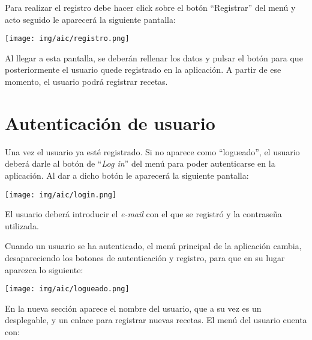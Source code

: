 \documentclass{\ClassPath/viu-tfm-template}
\begin{document}
Para realizar el registro debe hacer click sobre el botón “Registrar” del menú y acto seguido le aparecerá la siguiente pantalla:

\begin{center}
    \vspace{-10pt}
    \texttt{[image: img/aic/registro.png]}
    \vspace{-20pt}
\end{center}

Al llegar a esta pantalla, se deberán rellenar los datos y pulsar el botón para que posteriormente el usuario quede registrado en la aplicación. A partir de ese momento, el usuario podrá registrar recetas.


\section{Autenticación de usuario}
Una vez el usuario ya esté registrado. Si no aparece como “logueado”, el usuario deberá darle al botón de “\textit{Log in}” del menú para poder autenticarse en la aplicación. Al dar a dicho botón le aparecerá la siguiente pantalla:

\begin{center}
    \vspace{-10pt}
    \texttt{[image: img/aic/login.png]}
    \vspace{-20pt}
\end{center}

El usuario deberá introducir el \textit{e-mail} con el que se registró y la contraseña utilizada.

Cuando un usuario se ha autenticado, el menú principal de la aplicación cambia, desapareciendo los botones de autenticación y registro, para que en su lugar aparezca lo siguiente:


\begin{center}
    \vspace{-10pt}
    \texttt{[image: img/aic/logueado.png]}
    \vspace{-20pt}
\end{center}

En la nueva sección aparece el nombre del usuario, que a su vez es un desplegable, y un enlace para registrar nuevas recetas. El menú del usuario cuenta con:
\end{document}

